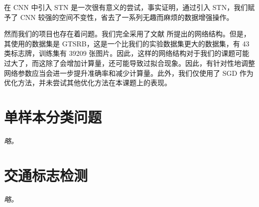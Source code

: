 \documentclass{report}
\begin{document}
在 CNN 中引入 STN 是一次很有意义的尝试，事实证明，通过引入 STN，我们赋予了 CNN 较强的空间不变性，省去了一系列无趣而麻烦的数据增强操作。

然而我们的项目也存在着问题。我们完全采用了文献 \cite{STN-CNN} 所提出的网络结构。但是，其使用的数据集是 GTSRB，这是一个比我们的实验数据集更大的数据集，有 43 类标志牌，训练集有 39209 张图片。因此，这样的网络结构对于我们的课题可能过大了，而这除了会增加计算量，还可能导致过拟合现象。因此，有针对性地调整网络参数应当会进一步提升准确率和减少计算量。此外，我们仅使用了 SGD 作为优化方法，并未尝试其他优化方法在本课题上的表现。

\chapter{单样本分类问题}

\emph{略。}

\chapter{交通标志检测}

\emph{略。}



\end{document}
